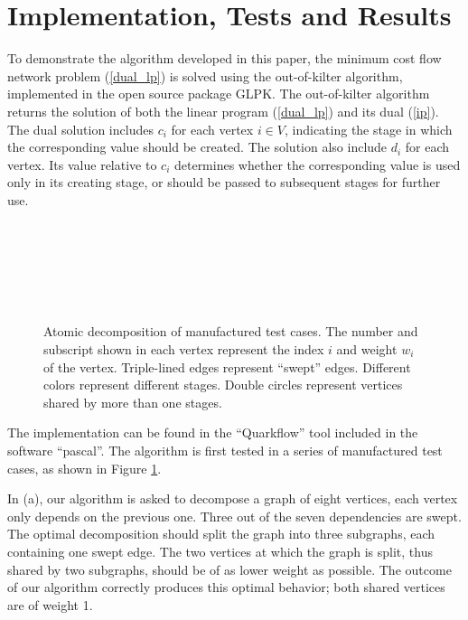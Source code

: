 \documentclass[review]{siamart0216}
\begin{document}
\section{Implementation, Tests and Results}

To demonstrate the algorithm developed in this paper,
the minimum cost flow network problem (\ref{dual_lp}) is
solved using the out-of-kilter algorithm\cite{}, implemented in the open source
package GLPK\cite{}.  The out-of-kilter algorithm returns the
solution of both the linear program (\ref{dual_lp}) and
its dual (\ref{ip}).  The dual solution includes $c_i$ for each vertex $i\in V$,
indicating the stage in which the corresponding value should be created.
The solution also include $d_i$ for each vertex.  Its value relative to
$c_i$ determines whether the corresponding value is used only in its
creating stage, or should be passed to subsequent stages for further use.

\begin{figure}[htb!] \centering
    \\
    \\
    \\
    \\
    \\
    \caption{Atomic decomposition of manufactured test cases.
    The number and subscript shown in each vertex represent the index $i$
    and weight $w_i$ of the vertex.  Triple-lined edges represent ``swept''
    edges.  Different colors represent different stages.
    Double circles represent vertices shared by more than one stages.}
    \label{f:manu}
\end{figure}

The implementation can be found in the ``Quarkflow'' tool included
in the software ``pascal''\footnotemark[1]
.
The algorithm is first tested in a series of manufactured test cases,
as shown in Figure \ref{f:manu}.

In (a), our algorithm is asked
to decompose a graph of eight vertices, each vertex only depends on the
previous one.  Three out of the seven dependencies are swept.  The
optimal decomposition should split the graph into three subgraphs,
each containing one swept edge.  The two vertices at which the graph
is split, thus shared by two subgraphs, should be of as lower weight
as possible.  The outcome of 
our algorithm correctly produces this optimal behavior; both shared
vertices are of weight 1.
\end{document}
